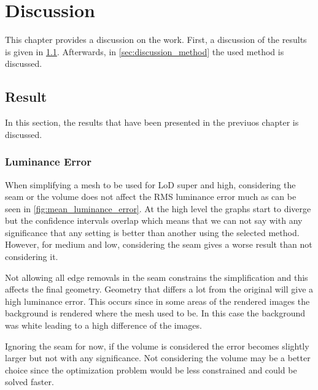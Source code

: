 
\chapter{Discussion} \label{cha:discussion}
This chapter provides a discussion on the work. First, a discussion of the results is given in \cref{sec:discussion_result}. Afterwards, in \cref{sec:discussion_method} the used method is discussed.

\section{Result} \label{sec:discussion_result}
In this section, the results that have been presented in the previuos chapter is discussed.

\subsection{Luminance Error} \label{sec:discussion_luminance}
When simplifying a mesh to be used for LoD super and high, considering the seam or the volume does not affect the RMS luminance error much as can be seen in \cref{fig:mean_luminance_error}. At the high level the graphs start to diverge but the confidence intervals overlap which means that we can not say with any significance that any setting is better than another using the selected method. However, for medium and low, considering the seam gives a worse result than not considering it.

Not allowing all edge removals in the seam constrains the simplification and this affects the final geometry. Geometry that differs a lot from the original will give a high luminance error. This occurs since in some areas of the rendered images the background is rendered where the mesh used to be. In this case the background was white leading to a high difference of the images.

Ignoring the seam for now, if the volume is considered the error becomes slightly larger but not with any significance. Not considering the volume may be a better choice since the optimization problem would be less constrained and could be solved faster.

